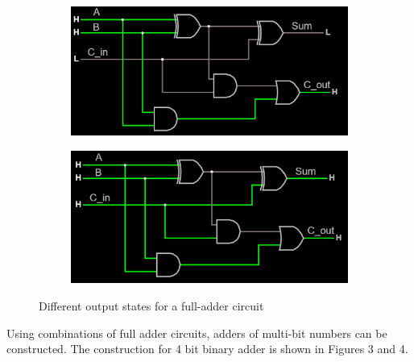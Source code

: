 \documentclass{article}
\begin{document}
\begin{figure}[H]
		\begin{subfigure}[b]{0.4\textwidth}
			\centering
			\includegraphics[width=\textwidth]{full_adder/full_adder_110.png}
		\end{subfigure}
		\begin{subfigure}[b]{0.4\textwidth}
			\includegraphics[width=\textwidth]{full_adder/full_adder_111.png}
		\end{subfigure}
		\caption{Different output states for a full-adder circuit}
		\label{fig:fulladder}
	\end{figure}
	
	Using combinations of full adder circuits, adders of multi-bit numbers can be constructed. The construction for 4 bit binary adder is shown in Figures 3 and 4.
	
\end{document}
